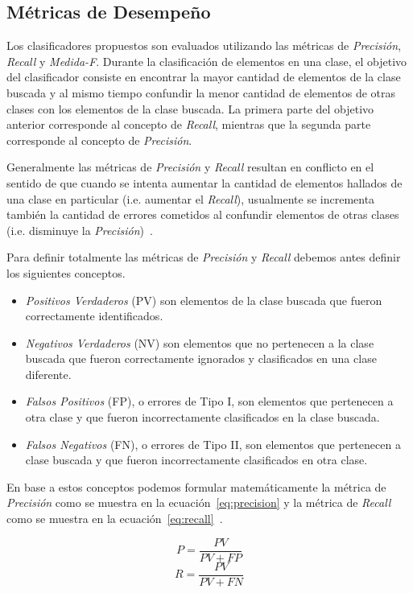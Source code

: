 \documentclass[runningheads,a4paper]{llncs}
\begin{document}
\subsection{Métricas de Desempeño}
\label{sec:metricas}
Los clasificadores propuestos son evaluados utilizando las métricas de \emph{Precisión}, \emph{Recall} y \emph{Medida-F}. Durante la clasificación de elementos en una clase, el objetivo del clasificador consiste en encontrar la mayor cantidad de elementos de la clase buscada y al mismo tiempo confundir la menor cantidad de elementos de otras clases con los elementos de la clase buscada. La primera parte del objetivo anterior corresponde al concepto de \emph{Recall}, mientras que la segunda parte corresponde al concepto de \emph{Precisi\'on}.

Generalmente las métricas de \emph{Precisión} y \emph{Recall} resultan en conflicto en el sentido de que cuando se intenta aumentar la cantidad de elementos hallados de una clase en particular (i.e. aumentar el \emph{Recall}), usualmente se incrementa también la cantidad de errores cometidos al confundir elementos de otras clases (i.e. disminuye la \emph{Precisión})~\cite{RAGHAVAN89}.

Para definir totalmente las métricas de \emph{Precisión} y \emph{Recall} debemos antes definir los siguientes conceptos.
\begin{itemize}
\item{\emph{Positivos Verdaderos} (PV) son elementos de la clase buscada que fueron correctamente identificados.}
\item{\emph{Negativos Verdaderos} (NV) son elementos que no pertenecen a la clase buscada que fueron correctamente ignorados y clasificados en una clase diferente.}
\item{\emph{Falsos Positivos} (FP), o errores de Tipo I, son elementos que pertenecen a otra clase y que fueron incorrectamente clasificados en la clase buscada.}
\item{\emph{Falsos Negativos} (FN), o errores de Tipo II, son elementos que pertenecen a clase buscada y que fueron incorrectamente clasificados en otra clase.}
\end{itemize}

En base a estos conceptos podemos formular matemáticamente la métrica de \emph{Precisión} como se muestra en la ecuación~\ref{eq:precision} y la métrica de \emph{Recall} como se muestra en la ecuación~\ref{eq:recall}~\cite{BIRD09}.

\begin{equation}
	\label{eq:precision}
	P = \frac{PV}{PV + FP}
\end{equation}
\begin{equation}
	\label{eq:recall}
	R = \frac{PV}{PV + FN}
\end{equation}
\end{document}
